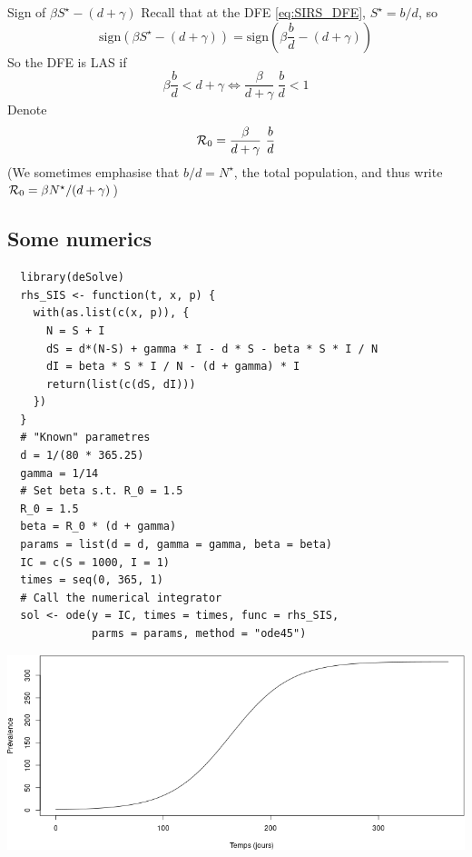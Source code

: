\documentclass[aspectratio=43]{beamer}
\begin{document}
\begin{frame}{Sign of $\beta S^\star-(d+\gamma)$}
Recall that at the DFE \eqref{eq:SIRS_DFE}, $S^\star=b/d$, so
\[
\text{sign}(\beta S^\star-(d+\gamma))
=\text{sign}\left(
\beta\frac{b}{d} -(d+\gamma)
\right)
\]
So the DFE is LAS if
\[
\beta\frac bd < d+\gamma
\iff \frac\beta{d+\gamma}\ \frac bd <1
\]
Denote
\begin{equation}\label{eq:SIRS_R0}
\mathcal{R}_0 = \frac\beta{d+\gamma}\ \frac bd
\end{equation}
\vfill
(We sometimes emphasise that $b/d=N^\star$, the total population, and thus write $\mathcal{R}_0=\beta N^\star/(d+\gamma)$)
\end{frame}



\subsection{Some numerics}


\begin{frame}[fragile]
\begin{lstlisting}
  library(deSolve)
  rhs_SIS <- function(t, x, p) {
    with(as.list(c(x, p)), {
      N = S + I
      dS = d*(N-S) + gamma * I - d * S - beta * S * I / N
      dI = beta * S * I / N - (d + gamma) * I
      return(list(c(dS, dI)))
    })
  }
  # "Known" parametres
  d = 1/(80 * 365.25)
  gamma = 1/14
  # Set beta s.t. R_0 = 1.5
  R_0 = 1.5
  beta = R_0 * (d + gamma)
  params = list(d = d, gamma = gamma, beta = beta)
  IC = c(S = 1000, I = 1)
  times = seq(0, 365, 1)
  # Call the numerical integrator
  sol <- ode(y = IC, times = times, func = rhs_SIS, 
             parms = params, method = "ode45")
  \end{lstlisting}
\end{frame}

\begin{frame}{}
  \begin{center}
    \includegraphics[width=\textwidth]{../FIGS/sol_endemic_SIS_R015.png}
  \end{center}
\end{frame}
\end{document}
